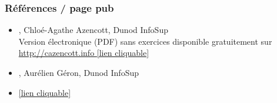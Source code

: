 

\begin{frame}
  \frametitle{Références / page pub}
  \begin{itemize}
  \item {}, Chloé-Agathe Azencott, Dunod InfoSup \\
    Version électronique (PDF) sans exercices disponible gratuitement sur  \textcolor{MyBlue}{\href{https://cazencott.info/index.php/pages/Introduction-au-Machine-Learning}{http://cazencott.info [lien cliquable]}}\\
  \item {}, Aurélien Géron, Dunod
    InfoSup
  \item {} \textcolor{MyBlue}{\href{https://inria.github.io/scikit-learn-mooc/}{[lien cliquable]}}
  \end{itemize}
\end{frame}


